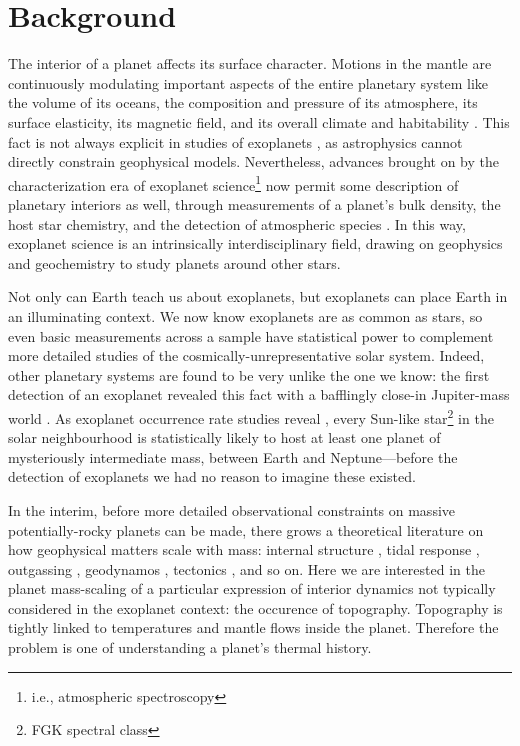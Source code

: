 \section{Background}

The interior of a planet affects its surface character. Motions in the mantle are continuously modulating important aspects of the entire planetary system like the volume of its oceans, the composition and pressure of its atmosphere, its surface elasticity, its magnetic field, and its overall climate and habitability \citep{Noack2014, Foley2016, Wordsworth2016, Tosi2017, Wordsworth2018, Shahar2019}. This fact is not always explicit in studies of exoplanets \citep{Shahar2019}, as astrophysics cannot directly constrain geophysical models. Nevertheless, advances brought on by the characterization era of exoplanet science\footnote{i.e., atmospheric spectroscopy} now permit some description of planetary interiors as well, through measurements of a planet's bulk density, the host star chemistry, and the detection of atmospheric species \citep{Santos2017, Dorn2017, Dorn2017a, Dorn2018, Bower2019, Madhusudhan2020}. In this way, exoplanet science is an intrinsically interdisciplinary field, drawing on geophysics and geochemistry to study planets around other stars.

Not only can Earth teach us about exoplanets, but exoplanets can place Earth in an illuminating context. We now know exoplanets are as common as stars, so even basic measurements across a sample have statistical power to complement more detailed studies of the cosmically-unrepresentative solar system. Indeed, other planetary systems are found to be very unlike the one we know: the first detection of an exoplanet revealed this fact with a bafflingly close-in Jupiter-mass world \citep{Mayor1995}. As exoplanet occurrence rate studies reveal \citep{Petigura2013, Foreman-Mackey2014, Dressing2015, Kunimoto2020}, every Sun-like star\footnote{FGK spectral class} in the solar neighbourhood is statistically likely to host at least one planet of mysteriously intermediate mass, between Earth and Neptune---before the detection of exoplanets we had no reason to imagine these existed. 

In the interim, before more detailed observational constraints on massive potentially-rocky planets can be made, there grows a theoretical literature on how geophysical matters scale with mass: internal structure \citep{Valencia2006, Zeng2017}, tidal response \citep{Tobie2019}, outgassing \citep{Kite2009, Noack2017, Dorn2018a}, geodynamos \citep{Gaidos2010}, tectonics \citep{ONeill2007, Korenaga2010}, and so on. Here we are interested in the planet mass-scaling of a particular expression of interior dynamics not typically considered in the exoplanet context: the occurence of topography. Topography is tightly linked to temperatures and mantle flows inside the planet. Therefore the problem is one of understanding a planet's thermal history.

